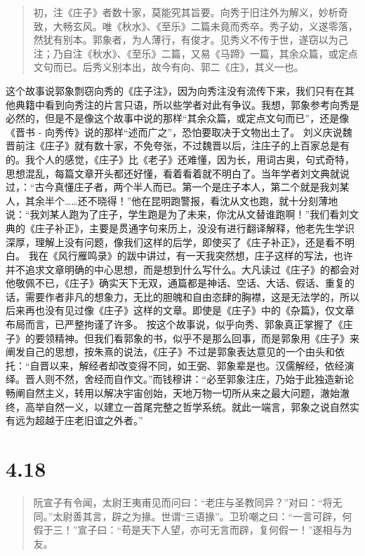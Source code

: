 \documentclass[]{book}
\begin{document}
\begin{quote}
初，注《庄子》者数十家，莫能究其旨要。向秀于旧注外为解义，妙析奇致，大畅玄风。唯《秋水》、《至乐》二篇未竟而秀卒。秀子幼，义遂零落，然犹有别本。郭象者，为人薄行，有俊才。见秀义不传于世，遂窃以为己注；乃自注《秋水》、《至乐》二篇，又易《马蹄》一篇，其余众篇，或定点文句而已。后秀义别本出，故今有向、郭二《庄》，其义一也。
\end{quote}

这个故事说郭象剽窃向秀的《庄子注》，因为向秀注没有流传下来，我们只有在其他典籍中看到向秀注的片言只语，所以些学者对此有争议。我想，郭象参考向秀是必然的，但是不是像这个故事中说的那样``其余众篇，或定点文句而已''，还是像《晋书
- 向秀传》说的那样``述而广之''，恐怕要取决于文物出土了。
刘义庆说魏晋前注《庄子》就有数十家，不免夸张，不过魏晋以后，注庄子的上百家总是有的。我个人的感觉，《庄子》比《老子》还难懂，因为长，用词古奥，句式奇特，思想混乱，每篇文章开头都还好懂，看着看着就不明白了。当年学者刘文典就说过，：``古今真懂庄子者，两个半人而已。第一个是庄子本人，第二个就是我刘某人，其余半个\ldots{}\ldots{}还不晓得！''他在昆明跑警报，看沈从文也跑，就十分刻薄地说：``我刘某人跑为了庄子，学生跑是为了未来，你沈从文替谁跑啊！''我们看刘文典的《庄子补正》，主要是贯通字句来历上，没没有进行翻译解释，他老先生学识深厚，理解上没有问题，像我们这样的后学，即使买了《庄子补正》，还是看不明白。
我在《风行雁鸣录》的跋中讲过，有一天我突然想，庄子这样的写法，也许并不追求文章明确的中心思想，而是想到什么写什么。大凡读过《庄子》的都会对他敬佩不已，《庄子》确实天下无双，通篇都是神话、空话、大话、假话、重复的话，需要作者非凡的想象力，无比的胆魄和自由恣肆的胸襟，这是无法学的，所以后来再也没有见过像《庄子》这样的文章。即使是《庄子》中的《杂篇》，仅文章布局而言，已严整拘谨了许多。
按这个故事说，似乎向秀、郭象真正掌握了《庄子》的要领精神。但我们看郭象的书，似乎不是那么回事，而是郭象用《庄子》来阐发自己的思想，按朱熹的说法，《庄子》不过是郭象表达意见的一个由头和依托：``自晋以来，解经者却改变得不同，如王弼、郭象辈是也。汉儒解经，依经演绎。晋人则不然，舍经而自作文。''而钱穆讲：``必至郭象注庄，乃始于此独造新论畅阐自然主义，转用以解决宇宙创始，天地万物一切所从来之最大问题，澈始澈终，高举自然一义，以建立一首尾完整之哲学系统。就此一端言，郭象之说自然实有远为超越于庄老旧谊之外者。''

\section{4.18}\label{section-197}

\begin{quote}
阮宣子有令闻，太尉王夷甫见而问曰：``老庄与圣教同异？''对曰：``将无同。''太尉善其言，辟之为掾。世谓``三语掾''。卫玠嘲之曰：``一言可辟，何假于三！''宣子曰：``苟是天下人望，亦可无言而辟，复何假一！''遂相与为友。
\end{quote}
\end{document}
